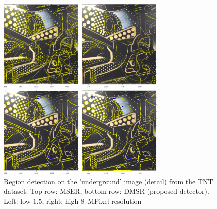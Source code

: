 \documentclass[conference,compsoc]{IEEEtran}
\begin{document}
\begin{figure}[htb]

\begin{minipage}[b]{.48\linewidth}
  \centering
  \centerline{\includegraphics[width=4cm]{tnt_mser_lores_zoom}}
\end{minipage}
\begin{minipage}[b]{0.5\linewidth}
  \centering
  \centerline{\includegraphics[width=4cm]{tnt_mser_hires_zoom}}
\end{minipage}
\hfill
\begin{minipage}[b]{.48\linewidth}
  \centering
  \centerline{\includegraphics[width=4cm]{tnt_dmsr_lores_zoom}}
\end{minipage}
\begin{minipage}[b]{0.505\linewidth}
  \centering
  \centerline{\includegraphics[width=4cm]{tnt_dmsr_hires_zoom}}
\end{minipage}
\hfill
\vspace{-0.5cm}
\caption{Region detection on the 'underground' image (detail) from the TNT dataset.  
Top row: MSER, bottom row: DMSR (proposed detector). Left: low $1.5$, right: high $8$~MPixel resolution}
\label{fig:tnt_zoom}
\vspace{-0.4cm}
\end{figure}
\end{document}
